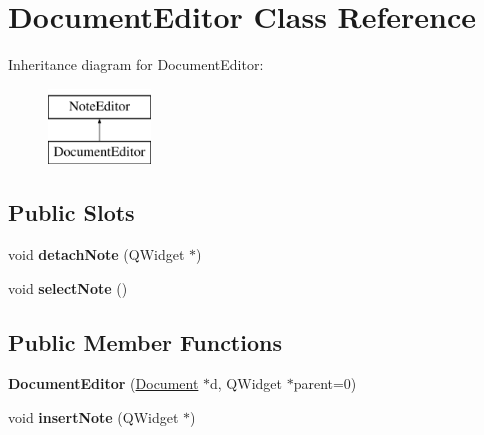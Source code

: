 \hypertarget{classDocumentEditor}{\section{\-Document\-Editor \-Class \-Reference}
\label{classDocumentEditor}
}
\-Inheritance diagram for \-Document\-Editor\-:\begin{figure}[H]
\begin{center}
\leavevmode
\includegraphics[height=2.000000cm]{classDocumentEditor}
\end{center}
\end{figure}
\subsection*{\-Public \-Slots}
\begin{DoxyCompactItemize}
\item 
\hypertarget{classDocumentEditor_a60c1c8cd663639290a501cc39c251b19}{void {\bfseries detach\-Note} (\-Q\-Widget $\ast$)}\label{classDocumentEditor_a60c1c8cd663639290a501cc39c251b19}

\item 
\hypertarget{classDocumentEditor_a9e770766f29b660cf9e92a17d4566160}{void {\bfseries select\-Note} ()}\label{classDocumentEditor_a9e770766f29b660cf9e92a17d4566160}

\end{DoxyCompactItemize}
\subsection*{\-Public \-Member \-Functions}
\begin{DoxyCompactItemize}
\item 
\hypertarget{classDocumentEditor_ade7db1a45d44b52ff4c78d4bfaeee8cd}{{\bfseries \-Document\-Editor} (\hyperlink{classDocument}{\-Document} $\ast$d, \-Q\-Widget $\ast$parent=0)}\label{classDocumentEditor_ade7db1a45d44b52ff4c78d4bfaeee8cd}

\item 
\hypertarget{classDocumentEditor_a40f1e3d58153ecd9a400cd9433f24937}{void {\bfseries insert\-Note} (\-Q\-Widget $\ast$)}\label{classDocumentEditor_a40f1e3d58153ecd9a400cd9433f24937}

\end{DoxyCompactItemize}
